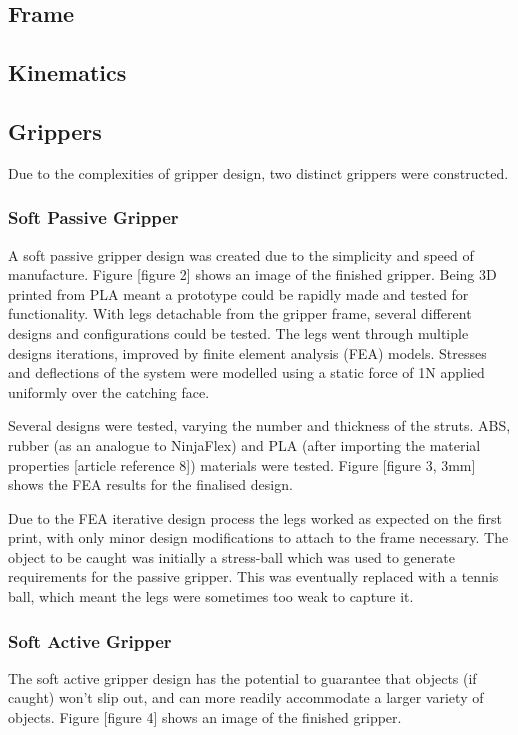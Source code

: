 \documentclass[conference]{IEEEtran}
\begin{document}
\subsection{Frame}
\subsection{Kinematics}
\subsection{Grippers}
Due to the complexities of gripper design, two distinct grippers were constructed.
\subsubsection{Soft Passive Gripper}
A soft passive gripper design was created due to the simplicity and speed of manufacture. Figure [figure 2] shows an image of the finished gripper.
Being 3D printed from PLA meant a prototype could be rapidly made and tested for functionality. With legs detachable from the gripper frame, several different designs and configurations could be tested. The legs went through multiple designs iterations, improved by finite element analysis (FEA) models. Stresses and deflections of the system were modelled using a static force of 1N applied uniformly over the catching face.

Several designs were tested, varying the number and thickness of the struts. ABS, rubber (as an analogue to NinjaFlex) and PLA (after importing the material properties [article reference 8]) materials were tested. Figure [figure 3, 3mm] shows the FEA results for the finalised design.

Due to the FEA iterative design process the legs worked as expected on the first print, with only minor design modifications to attach to the frame necessary. The object to be caught was initially a stress-ball which was used to generate requirements for the passive gripper. This was eventually replaced with a tennis ball, which meant the legs were sometimes too weak to capture it. 
\subsubsection{Soft Active Gripper}
The soft active gripper design has the potential to guarantee that objects (if caught) won’t slip out, and can more readily accommodate a larger variety of objects. Figure [figure 4] shows an image of the finished gripper.
\end{document}
